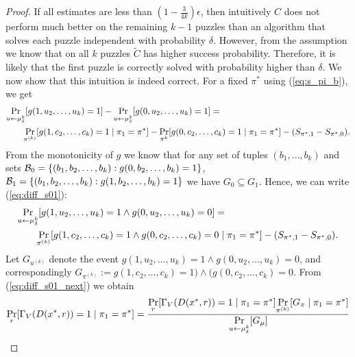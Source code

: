\begin{proof}
If all estimates are less than $(1-\frac{3}{4k})\epsilon$, then intuitively $C$
does not perform much better on the remaining $k-1$ puzzles than an algorithm that solves each puzzle independent with probability $\delta$.
However, from the assumption we know that on all $k$ puzzles $\widetilde{C}$ has higher success probability.
Therefore, it is likely that the first puzzle is correctly solved with probability higher than $\delta$.
%
We now show that this intuition is indeed correct. For a fixed $\pi^*$ using (\ref{eq:s_pi_b}), we get
\begin{align}
\label{eq:diff_s01}
  &\underset{u \leftarrow \mu_{\delta}^k}{\Pr}[g(1, u_2, \dots, u_k)=1] - \underset{u \leftarrow \mu_{\delta}^k}{\Pr}[g(0, u_2, \dots, u_k)=1] = \notag\\
&\mbox\qquad  \underset{\pi^{(k)}}{\Pr}[g(1, c_2, \dots, c_k) =1 \mid \pi_1 = \pi^*] - \underset{\pi^k}{\Pr}[g(0, c_2, \dots, c_k) = 1 \mid \pi_1 = \pi^*] - (S_{\pi^*,1} - S_{\pi^*,0}).
\end{align}
From the monotonicity of $g$ we know that for any set of tuples $(b_1, \dots, b_k)$
and sets $\mathcal{B}_0 = \{ (b_1, b_2, \dots, b_k): g(0, b_2, \dots, b_k) = 1\}$, $ \mathcal{B}_1 = \{(b_1, b_2, \dots, b_k) : g(1, b_2, \dots, b_k) = 1 \}$
we have $G_0 \subseteq G_1$. Hence, we can write (\ref{eq:diff_s01}):
\begin{align}
  \label{eq:diff_s01_next}
  &\underset{u \leftarrow \mu_{\delta}^k}{\Pr}[g(1, u_2, \dots, u_k) = 1 \land g(0, u_2, \dots, u_k) = 0] = \notag\\
&\mbox\qquad  \underset{\pi^{(k)}}{\Pr}[g(1, c_2, \dots, c_k) = 1 \land g(0, c_2, \dots, c_k) = 0 \mid \pi_1 = \pi^*] - (S_{\pi^*,1} - S_{\pi^*,0}).
\end{align}
Let $G_{u^{(k)}}$ denote the event $g(1, u_2, \dots, u_k) = 1 \land g(0, u_2, \dots, u_k) = 0$, and correspondingly
$G_{\pi^{(k)}} := g(1, c_2, \dots, c_k) = 1) \land (g(0, c_2, \dots, c_k) = 0$.
From (\ref{eq:diff_s01_next}) we obtain
\begin{align}
\label{eq:pr_d_succ_0}
  \underset{r}{\Pr}[\Gamma_V(D(x^*, r)) = 1 \mid \pi_1 = \pi^*] &=
  \frac{\underset{r}{\Pr}[\Gamma_V(D(x^*, r)) = 1 \mid \pi_1 = \pi^*] \underset{\pi^{(k)}}{\Pr}[G_{\pi} \mid \pi_1 = \pi^*]} {\underset{u \leftarrow \mu_{\delta}^{k}}{\Pr}[G_{\mu}]} \notag\\

\end{align}
\end{proof}
